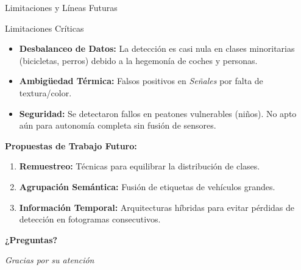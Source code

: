 \documentclass[aspectratio=169]{beamer}
\begin{document}
\begin{frame}{Limitaciones y Líneas Futuras}
	\begin{alertblock}{Limitaciones Críticas}
		\begin{itemize}
			\item \textbf{Desbalanceo de Datos:} La detección es casi nula en clases minoritarias (bicicletas, perros) debido a la hegemonía de coches y personas.
			\item \textbf{Ambigüedad Térmica:} Falsos positivos en \textit{Señales} por falta de textura/color.
			\item \textbf{Seguridad:} Se detectaron fallos en peatones vulnerables (niños). No apto aún para autonomía completa sin fusión de sensores.
		\end{itemize}
	\end{alertblock}
	
	\vspace{0.3cm}
	\textbf{Propuestas de Trabajo Futuro:}
	\begin{enumerate}
		\item \textbf{Remuestreo:} Técnicas para equilibrar la distribución de clases.
		\item \textbf{Agrupación Semántica:} Fusión de etiquetas de vehículos grandes.
		\item \textbf{Información Temporal:} Arquitecturas híbridas para evitar pérdidas de detección en fotogramas consecutivos.
	\end{enumerate}
\end{frame}

\begin{frame}[plain]
	\centering
	\vspace{1cm}
	
	\Huge \textbf{¿Preguntas?}
	
	\vspace{1.5cm}
	\large \textit{Gracias por su atención}
\end{frame}
\end{document}
